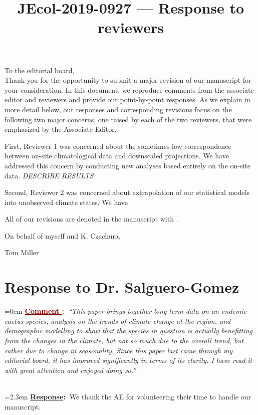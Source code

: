 \documentclass[12pt]{article}
\newcounter{cN}
\newcommand{\comment}[1]{
	\vspace{2em}
	\refstepcounter{cN} %
	\noindent \hangindent=0em \textbf{\textcolor{Maroon}{\uline{Comment \thecN}:~}}\emph{``#1''}
	}
\newcommand{\response}[1]{
	\\[0.25em]
	\hangindent=2.3em \textbf{\textcolor{NavyBlue}{\uline{Response}:~}}#1
	}
\newcommand{\revise}[1]{{\color{Mahogany}{#1}}}
\begin{document}
\title{JEcol-2019-0927 --- Response to reviewers}

\maketitle
\noindent To the editorial board,\\

Thank you for the opportunity to submit a major revision of our manuscript for your consideration. 
In this document, we reproduce comments from the associate editor and reviewers and provide our point-by-point responses. As we explain in more detail below, our responses and corresponding revisions focus on the following two major concerns, one raised by each of the two reviewers, that were emphasized by the Associate Editor.

First, Reviewer 1 was concerned about the sometimes-low correspondence between on-site climatological data and downscaled projections. 
We have addressed this concern by conducting new analyses based entirely on the on-site data. 
\textit{DESCRIBE RESULTS}

Second, Reviewer 2 was concerned about extrapolation of our statistical models into unobserved climate states. 
We have

All of our revisions are denoted in the manuscript with \revise{Mahogany font}.

\vspace{2em}
\hfill On behalf of myself and K. Czachura,

\hfill Tom Miller
\newpage



\section{Response to Dr. Salguero-Gomez}
\vspace{-2em}

\comment{This paper brings together long-term data on an endemic cactus species, analysis on the trends of climate change at the region, and demographic modelling to show that the species in question is actually benefitting from the changes in the climate, but not so much due to the overall trend, but rather due to change in seasonality. Since this paper last came through my editorial board, it has improved significantly in terms of its clarity. I have read it with great attention and enjoyed doing so.}
\response{We thank the AE for volunteering their time to handle our manuscript.}
\end{document}
